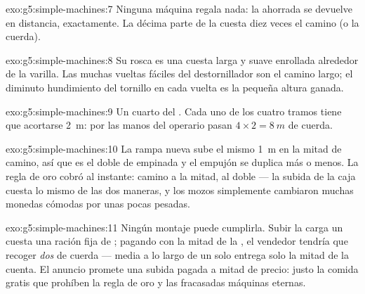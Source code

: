 \begin{solution}{exo:g5:simple-machines:7}
Ninguna máquina regala nada: la  ahorrada se devuelve en
distancia, exactamente. La décima parte de la  cuesta diez
veces el camino (o la cuerda).
\end{solution}

\begin{solution}{exo:g5:simple-machines:8}
Su rosca es una cuesta larga y suave enrollada alrededor de la
varilla. Las muchas vueltas fáciles del destornillador son el camino
largo; el diminuto hundimiento del tornillo en cada vuelta es la
pequeña altura ganada.
\end{solution}

\begin{solution}{exo:g5:simple-machines:9}
Un cuarto del . Cada uno de los cuatro tramos tiene que
acortarse \qty{2}{m}: por las manos del operario pasan
$4 \times 2 = \qty{8}{m}$ de cuerda.
\end{solution}

\begin{solution}{exo:g5:simple-machines:10}
La rampa nueva sube el mismo \qty{1}{m} en la mitad de camino, así que
es el doble de empinada y el empujón se duplica más o menos. La regla
de oro cobró al instante: camino a la mitad,  al doble --- la
subida de la caja cuesta lo mismo de las dos maneras, y los mozos
simplemente cambiaron muchas monedas cómodas por unas pocas pesadas.
\end{solution}

\begin{solution}{exo:g5:simple-machines:11}
Ningún montaje puede cumplirla. Subir la carga un  cuesta una
ración fija de ; pagando con la mitad de la , el
vendedor tendría que recoger \emph{dos}  de cuerda --- media
 a lo largo de un solo  entrega solo la mitad de la
cuenta. El anuncio promete una subida pagada a mitad de precio: justo
la comida gratis que prohíben la regla de oro y las fracasadas
máquinas eternas.
\end{solution}
